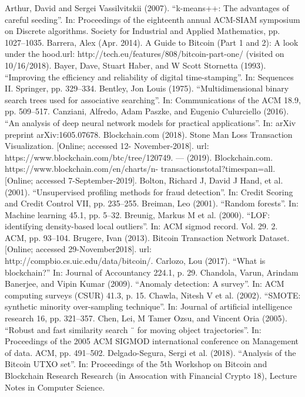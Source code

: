 \documentclass[journal]{IEEEtran}
\begin{document}
\begin{thebibliography}{00}
 Arthur, David and Sergei Vassilvitskii (2007). “k-means++: The advantages of careful seeding”. In: Proceedings of the eighteenth annual ACM-SIAM symposium on Discrete algorithms. Society for Industrial and Applied Mathematics, pp. 1027–1035.
 Barrera, Alex (Apr. 2014). A Guide to Bitcoin (Part 1 and 2): A look under the hood.url: http://tech.eu/features/808/bitcoin-part-one/ (visited on 10/16/2018).
 Bayer, Dave, Stuart Haber, and W Scott Stornetta (1993). “Improving the efficiency and reliability of digital time-stamping”. In: Sequences II. Springer, pp. 329–334. 
 Bentley, Jon Louis (1975). “Multidimensional binary search trees used for associative searching”. In: Communications of the ACM 18.9, pp. 509–517.
Canziani, Alfredo, Adam Paszke, and Eugenio Culurciello (2016). “An analysis of deep neural network models for practical applications”. In: arXiv preprint arXiv:1605.07678.
Blockchain.com (2018). Stone Man Loss Transaction Visualization. [Online; accessed 12- November-2018]. url: https://www.blockchain.com/btc/tree/120749. — (2019). Blockchain.com. https://www.blockchain.com/en/charts/n- transactionstotal?timespan=all. [Online; accessed 7-September-2019].
Bolton, Richard J, David J Hand, et al. (2001). “Unsupervised profiling methods for fraud detection”. In: Credit Scoring and Credit Control VII, pp. 235–255.
Breiman, Leo (2001). “Random forests”. In: Machine learning 45.1, pp. 5–32.
Breunig, Markus M et al. (2000). “LOF: identifying density-based local outliers”. In: ACM sigmod record. Vol. 29. 2. ACM, pp. 93–104.
Brugere, Ivan (2013). Bitcoin Transaction Network Dataset. [Online; accessed 29-November2018]. url: http://compbio.cs.uic.edu/data/bitcoin/.
Carlozo, Lou (2017). “What is blockchain?” In: Journal of Accountancy 224.1, p. 29.
Chandola, Varun, Arindam Banerjee, and Vipin Kumar (2009). “Anomaly detection: A
survey”. In: ACM computing surveys (CSUR) 41.3, p. 15.
Chawla, Nitesh V et al. (2002). “SMOTE: synthetic minority over-sampling technique”.
In: Journal of artificial intelligence research 16, pp. 321–357.
Chen, Lei, M Tamer Ozsu, and Vincent Oria (2005). “Robust and fast similarity search ¨
for moving object trajectories”. In: Proceedings of the 2005 ACM SIGMOD international conference on Management of data. ACM, pp. 491–502.
Delgado-Segura, Sergi et al. (2018). “Analysis of the Bitcoin UTXO set”. In: Proceedings
of the 5th Workshop on Bitcoin and Blockchain Research Research (in Assocation
with Financial Crypto 18), Lecture Notes in Computer Science.


\end{thebibliography}
\vspace{12pt}
\end{document}
